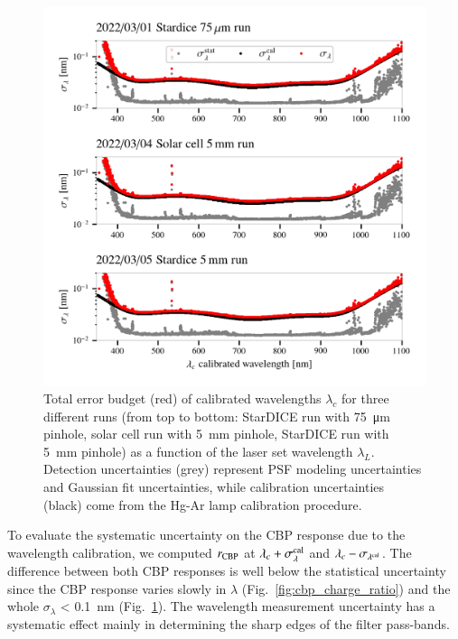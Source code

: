 \begin{figure}%
\centering
\includegraphics[width=\columnwidth]{fig/spectrograph_error_budget.png}
\caption{Total error budget (red) of calibrated wavelengths $\lambda_c$ for three different runs (from top to bottom: StarDICE run with \SI{75}{\um} pinhole, solar cell run with \SI{5}{mm} pinhole, StarDICE run with \SI{5}{mm} pinhole) as a function of the laser set wavelength $\lambda_L$. Detection uncertainties (grey) represent PSF modeling uncertainties and Gaussian fit uncertainties, while calibration uncertainties (black) come from the Hg-Ar lamp calibration procedure. }\label{fig:wavelength_error_budget}
\end{figure}

To evaluate the systematic uncertainty on the CBP response due to the wavelength calibration, we computed $r_{\rm CBP}$ at $\lambda_c+\sigma_{\lambda}^{\rm cal}$ and $\lambda_c-\sigma_{\lambda^{\rm cal}}$. The difference between both CBP responses is well below the statistical uncertainty since the CBP response varies slowly in $\lambda$ (Fig.~\ref{fig:cbp_charge_ratio}) and the whole $\sigma_\lambda$ < \SI{0.1}{\nano\meter} (Fig.~\ref{fig:wavelength_error_budget}). The wavelength measurement uncertainty has a systematic effect mainly in determining the sharp edges of the filter pass-bands.

